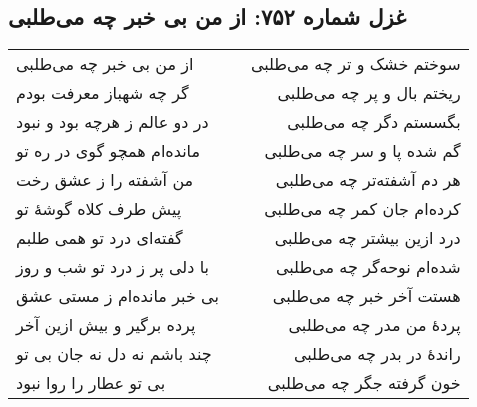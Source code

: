\begin{center}
\section*{غزل شماره ۷۵۲: از من بی خبر چه می‌طلبی}
\label{sec:752}
\begin{longtable}{l p{0.5cm} r}
از من بی خبر چه می‌طلبی
&&
سوختم خشک و تر چه می‌طلبی
\\
گر چه شهباز معرفت بودم
&&
ریختم بال و پر چه می‌طلبی
\\
در دو عالم ز هرچه بود و نبود
&&
بگسستم دگر چه می‌طلبی
\\
مانده‌ام همچو گوی در ره تو
&&
گم شده پا و سر چه می‌طلبی
\\
من آشفته را ز عشق رخت
&&
هر دم آشفته‌تر چه می‌طلبی
\\
پیش طرف کلاه گوشهٔ تو
&&
کرده‌ام جان کمر چه می‌طلبی
\\
گفته‌ای درد تو همی طلبم
&&
درد ازین بیشتر چه می‌طلبی
\\
با دلی پر ز درد تو شب و روز
&&
شده‌ام نوحه‌گر چه می‌طلبی
\\
بی خبر مانده‌ام ز مستی عشق
&&
هستت آخر خبر چه می‌طلبی
\\
پرده برگیر و بیش ازین آخر
&&
پردهٔ من مدر چه می‌طلبی
\\
چند باشم نه دل نه جان بی تو
&&
راندهٔ در بدر چه می‌طلبی
\\
بی تو عطار را روا نبود
&&
خون گرفته جگر چه می‌طلبی
\\
\end{longtable}
\end{center}
